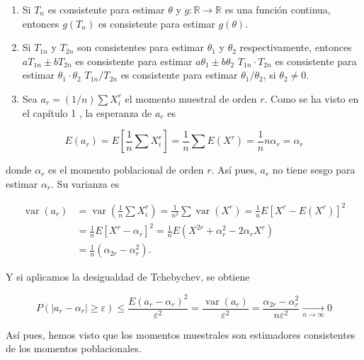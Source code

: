\documentclass[
]{article}
\providecommand{\tightlist}{%
  \setlength{\itemsep}{0pt}\setlength{\parskip}{0pt}}
\begin{document}
\begin{enumerate}
\def\labelenumi{\arabic{enumi}.}
\tightlist
\item
  Si \(T_{n}\) es consistente para estimar \(\theta\) y \(g: \mathbb{R} \rightarrow \mathbb{R}\) es una función continua, entonces \(g\left(T_{n}\right)\) es consistente para estimar \(g(\theta)\).
\item
  Si \(T_{1 n}\) y \(T_{2 n}\) son consistentes para estimar \(\theta_{1}\) y \(\theta_{2}\) respectivamente, entonces
  \(a T_{1 n} \pm b T_{2 n}\) es consistente para estimar \(a \theta_{1} \pm b \theta_{2}\)
  \(T_{1 n} \cdot T_{2 n}\) es consistente para estimar \(\theta_{1} \cdot \theta_{2}\)
  \(T_{1 n} / T_{2 n}\) es consistente para estimar \(\theta_{1} / \theta_{2}\), si \(\theta_{2} \neq 0\).
\item
  Sea \(a_{r}=(1 / n) \sum X_{i}^{r}\) el momento muestral de orden \(r\). Como se ha visto en el capítulo 1 , la esperanza de \(a_{r}\) es
\end{enumerate}

\[
E\left(a_{r}\right)=E\left[\frac{1}{n} \sum X_{i}^{r}\right]=\frac{1}{n} \sum E\left(X^{r}\right)=\frac{1}{n} n \alpha_{r}=\alpha_{r}
\]

donde \(\alpha_{r}\) es el momento poblacional de orden \(r\). Así pues, \(a_{r}\) no tiene sesgo para estimar \(\alpha_{r}\). Su varianza es

\[
\begin{aligned}
\operatorname{var}\left(a_{r}\right) & =\operatorname{var}\left(\frac{1}{n} \sum X_{i}^{r}\right)=\frac{1}{n^{2}} \sum \operatorname{var}\left(X^{r}\right)=\frac{1}{n} E\left[X^{r}-E\left(X^{r}\right)\right]^{2} \\
& =\frac{1}{n} E\left[X^{r}-\alpha_{r}\right]^{2}=\frac{1}{n} E\left(X^{2 r}+\alpha_{r}^{2}-2 \alpha_{r} X^{r}\right) \\
& =\frac{1}{n}\left(\alpha_{2 r}-\alpha_{r}^{2}\right) .
\end{aligned}
\]

Y si aplicamos la desigualdad de Tchebychev, se obtiene

\[
P\left(\left|a_{r}-\alpha_{r}\right| \geq \varepsilon\right) \leq \frac{E\left(a_{r}-\alpha_{r}\right)^{2}}{\varepsilon^{2}}=\frac{\operatorname{var}\left(a_{r}\right)}{\varepsilon^{2}}=\frac{\alpha_{2 r}-\alpha_{r}^{2}}{n \varepsilon^{2}} \underset{n \rightarrow \infty}{\longrightarrow} 0
\]

Así pues, hemos visto que los momentos muestrales son estimadores consistentes de los momentos poblacionales.
\end{document}
